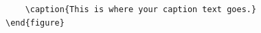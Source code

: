 \documentclass{article}
\begin{document}
\begin{verbatim}
    \caption{This is where your caption text goes.}
\end{figure}
\end{verbatim}

\begin{figure}
    \centering
     \hfill

\end{figure}
\end{document}
